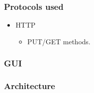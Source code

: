 \documentclass[a4paper, 11pt]{article}
\begin{document}
\subsubsection{Protocols used}
\begin{itemize}
\item HTTP 
  \begin{itemize}
  \item PUT/GET methods.
  \end{itemize}
\end{itemize}
\subsubsection{GUI}
\subsubsection{Architecture}
\end{document}
